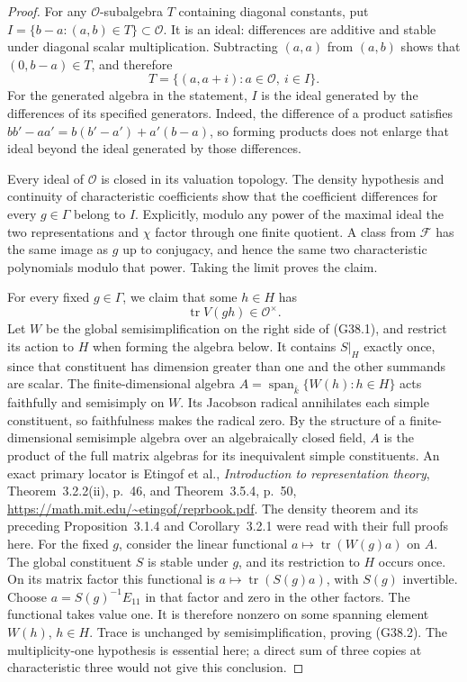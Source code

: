 \begin{proof}
For any $\mathcal O$-subalgebra $T$ containing diagonal
constants, put
$I=\{b-a:(a,b)\in T\}\subset\mathcal O$.
It is an ideal: differences are additive and stable under
diagonal scalar multiplication.  Subtracting $(a,a)$ from
$(a,b)$ shows that $(0,b-a)\in T$, and therefore
\[
                         T=\{(a,a+i):a\in\mathcal O,\ i\in I\}.
                                                               \tag{G38.5}
\]
For the generated algebra in the statement, $I$ is the ideal
generated by the differences of its specified generators.
Indeed, the difference of a product satisfies
$bb'-aa'=b(b'-a')+a'(b-a)$, so forming products does not
enlarge that ideal beyond the ideal generated by those differences.

Every ideal of $\mathcal O$ is closed in its valuation topology.
The density hypothesis and continuity of characteristic
coefficients show that the coefficient differences for every
$g\in\Gamma$ belong to $I$.  Explicitly, modulo any power
of the maximal ideal the two representations and $\chi$
factor through one finite quotient.  A class from
$\mathcal F$ has the same image as $g$ up to conjugacy,
and hence the same two characteristic polynomials modulo
that power.  Taking the limit proves the claim.

For every fixed $g\in\Gamma$, we claim that some $h\in H$ has
\[
                 \operatorname{tr}V(gh)\in\mathcal O^\times.
                                                               \tag{G38.2}
\]
Let $W$ be the global semisimplification on the right
side of (G38.1), and restrict its action to $H$ when
forming the algebra below.
It contains $S|_H$ exactly once, since that constituent
has dimension greater than one and the other summands
are scalar.  The finite-dimensional algebra
$A=\operatorname{span}_{\overline k}\{W(h):h\in H\}$
acts faithfully and semisimply on $W$.
Its Jacobson radical annihilates each simple constituent,
so faithfulness makes the radical zero.  By the structure
of a finite-dimensional semisimple algebra over an
algebraically closed field, $A$ is the product of the
full matrix algebras for its inequivalent simple
constituents.  An exact primary locator is Etingof et al.,
\emph{Introduction to representation theory},
Theorem~3.2.2(ii), p.~46, and Theorem~3.5.4, p.~50,
\url{https://math.mit.edu/~etingof/reprbook.pdf}.
The density theorem and its preceding Proposition~3.1.4
and Corollary~3.2.1 were read with their full proofs here.
For the fixed $g$, consider the linear functional
$a\mapsto\operatorname{tr}(W(g)a)$ on $A$.
The global constituent $S$ is stable under $g$, and its
restriction to $H$ occurs once.  On its matrix factor
this functional is $a\mapsto\operatorname{tr}(S(g)a)$,
with $S(g)$ invertible.  Choose $a=S(g)^{-1}E_{11}$
in that factor and zero in the other factors.  The
functional takes value one.  It is therefore nonzero
on some spanning element $W(h)$, $h\in H$.
Trace is unchanged by semisimplification, proving (G38.2).  The multiplicity-one hypothesis
is essential here; a direct sum of three copies at
characteristic three would not give this conclusion.


\end{proof}
